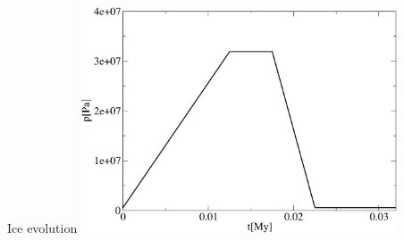 \documentclass{beamer}
\begin{document}
\begin{frame}{Ice evolution}
\centering
\includegraphics[width=0.7\textwidth]{figure/top_pres}
\end{frame}
\end{document}
